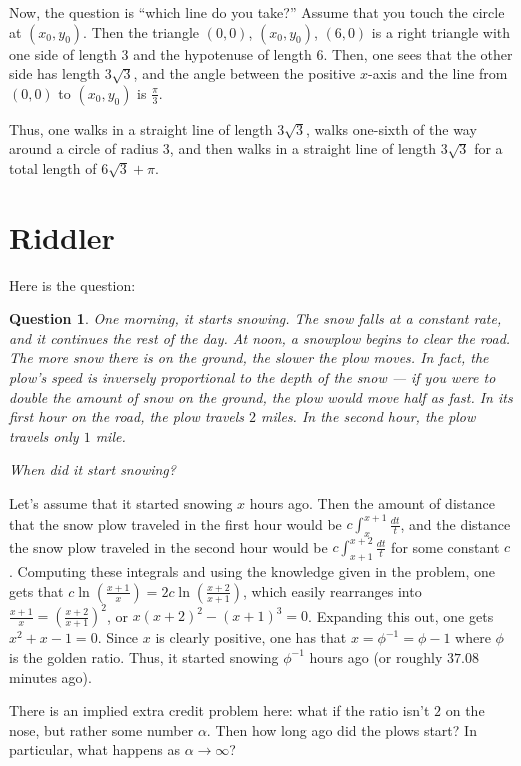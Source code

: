 \documentclass[11pt]{article}
\newtheorem{question}[theorem]{Question}
\theoremstyle{definition}
\begin{document}
Now, the question is ``which line do you take?''  Assume that you touch the circle at $(x_0, y_0)$.  Then the triangle $(0,0)$, $(x_0, y_0)$, $(6,0)$ is a right triangle with one side of length $3$ and the hypotenuse of length $6$.  Then, one sees that the other side has length $3\sqrt{3}$, and the angle between the positive $x$-axis and the line from $(0,0)$ to $(x_0, y_0)$ is $\frac{\pi}{3}$.

Thus, one walks in a straight line of length $3\sqrt{3}$, walks one-sixth of the way around a circle of radius $3$, and then walks in a straight line of length $3\sqrt{3}$ for a total length of $6\sqrt{3} + \pi$.
\section{Riddler}
Here is the question:
\begin{question}
One morning, it starts snowing. The snow falls at a constant rate, and it continues the rest of the day.  At noon, a snowplow begins to clear the road. The more snow there is on the ground, the slower the plow moves. In fact, the plow's speed is inversely proportional to the depth of the snow — if you were to double the amount of snow on the ground, the plow would move half as fast.  In its first hour on the road, the plow travels $2$ miles. In the second hour, the plow travels only $1$ mile.

When did it start snowing?
\end{question}
Let's assume that it started snowing $x$ hours ago.  Then the amount of distance that the snow plow traveled in the first hour would be $c\int_{x}^{x+1}\frac{dt}{t}$, and the distance the snow plow traveled in the second hour would be $c\int_{x+1}^{x+2}\frac{dt}{t}$ for some constant $c$.  Computing these integrals and using the knowledge given in the problem, one gets that $\displaystyle{c\ln\left(\frac{x+1}{x}\right) = 2c\ln\left(\frac{x+2}{x+1}\right)}$, which easily rearranges into $\frac{x+1}{x} = \left(\frac{x+2}{x+1}\right)^2$, or $x(x+2)^2 - (x+1)^3 = 0$.  Expanding this out, one gets $x^2 + x -1 = 0$.  Since $x$ is clearly positive, one has that $x = \phi^{-1} = \phi - 1$ where $\phi$ is the golden ratio.  Thus, it started snowing $\phi^{-1}$ hours ago (or roughly $37.08$ minutes ago).

There is an implied extra credit problem here: what if the ratio isn't $2$ on the nose, but rather some number $\alpha$.  Then how long ago did the plows start?  In particular, what happens as $\alpha \rightarrow \infty$?
\end{document}

